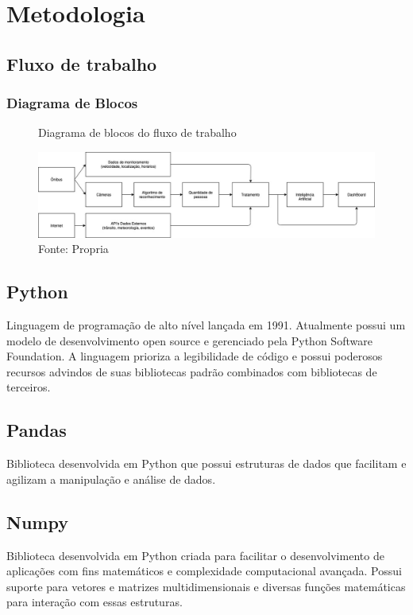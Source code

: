 \chapter{Metodologia}
\label{Cap:MateriaisMetodos}


\section{Fluxo de trabalho}
\subsection{Diagrama de Blocos}

\begin{figure}[H]
    \centering
    \caption{Diagrama de blocos do fluxo de trabalho}
    \includegraphics[width=1.0\linewidth]{Imagens/diagramaDeBlocos.jpg}
    \caption*{Fonte: Propria}
    \label{autoai-results}
\end{figure}

\section{Python}
\indent
\par Linguagem de programação de alto nível lançada em 1991. Atualmente possui um modelo de desenvolvimento open source e gerenciado pela Python Software Foundation. A linguagem prioriza a legibilidade de código e possui poderosos recursos advindos de suas bibliotecas padrão combinados com bibliotecas de terceiros.

\section{Pandas}
\indent
\par Biblioteca desenvolvida em Python que possui estruturas de dados que facilitam e agilizam a manipulação e análise de dados.

\section{Numpy}
\indent
\par Biblioteca desenvolvida em Python criada para facilitar o desenvolvimento de aplicações com fins matemáticos e complexidade computacional avançada. Possui suporte para vetores e matrizes multidimensionais e diversas funções matemáticas para interação com essas estruturas.


